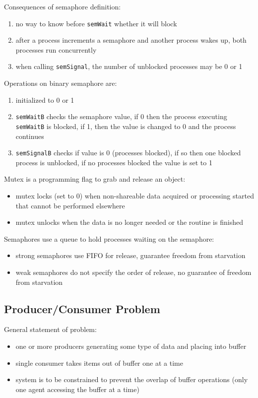 \documentclass[11pt]{article}
\begin{document}
Consequences of semaphore definition:
\begin{enumerate}
\item no way to know before \texttt{semWait} whether it will block
\item after a process increments a semaphore and another
process wakes up, both processes run concurrently
\item when calling \texttt{semSignal}, the number of unblocked
processes may be 0 or 1
\end{enumerate}

Operations on binary semaphore are:
\begin{enumerate}
\item initialized to 0 or 1
\item \texttt{semWaitB} checks the semaphore value, if 0 then the
process executing \texttt{semWaitB} is blocked, if 1, then
the value is changed to 0 and the process continues
\item \texttt{semSignalB} checks if value is 0 (processes blocked),
if so then one blocked process is unblocked, if no
processes blocked the value is set to 1
\end{enumerate}

Mutex is a programming flag to grab and release an object:
\begin{itemize}
\item mutex locks (set to 0) when non-shareable data acquired or
processing started that cannot be performed elsewhere
\item mutex unlocks when the data is no longer needed or the
routine is finished
\end{itemize}

Semaphores use a queue to hold processes waiting on the
semaphore:
\begin{itemize}
\item strong semaphores use FIFO for release, guarantee
freedom from starvation
\item weak semaphores do not specify the order of release,
no guarantee of freedom from starvation
\end{itemize}
\subsection{Producer/Consumer Problem}
\label{sec:org394ee82}
General statement of problem:
\begin{itemize}
\item one or more producers generating some type of data
and placing into buffer
\item single consumer takes items out of buffer one at
a time
\item system is to be constrained to prevent the overlap
of buffer operations (only one agent accessing the
buffer at a time)
\end{itemize}
\end{document}
